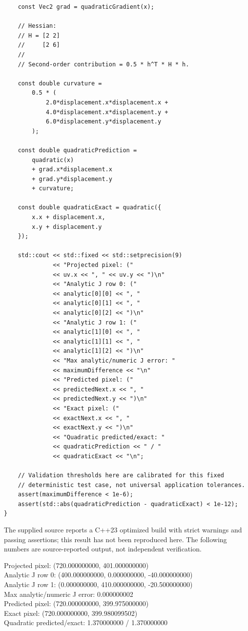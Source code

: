 \begin{verbatim}
    const Vec2 grad = quadraticGradient(x);

    // Hessian:
    // H = [2 2]
    //     [2 6]
    //
    // Second-order contribution = 0.5 * h^T * H * h.

    const double curvature =
        0.5 * (
            2.0*displacement.x*displacement.x +
            4.0*displacement.x*displacement.y +
            6.0*displacement.y*displacement.y
        );

    const double quadraticPrediction =
        quadratic(x)
        + grad.x*displacement.x
        + grad.y*displacement.y
        + curvature;

    const double quadraticExact = quadratic({
        x.x + displacement.x,
        x.y + displacement.y
    });

    std::cout << std::fixed << std::setprecision(9)
              << "Projected pixel: ("
              << uv.x << ", " << uv.y << ")\n"
              << "Analytic J row 0: ("
              << analytic[0][0] << ", "
              << analytic[0][1] << ", "
              << analytic[0][2] << ")\n"
              << "Analytic J row 1: ("
              << analytic[1][0] << ", "
              << analytic[1][1] << ", "
              << analytic[1][2] << ")\n"
              << "Max analytic/numeric J error: "
              << maximumDifference << "\n"
              << "Predicted pixel: ("
              << predictedNext.x << ", "
              << predictedNext.y << ")\n"
              << "Exact pixel: ("
              << exactNext.x << ", "
              << exactNext.y << ")\n"
              << "Quadratic predicted/exact: "
              << quadraticPrediction << " / "
              << quadraticExact << "\n";

    // Validation thresholds here are calibrated for this fixed
    // deterministic test case, not universal application tolerances.
    assert(maximumDifference < 1e-6);
    assert(std::abs(quadraticPrediction - quadraticExact) < 1e-12);
}
\end{verbatim}

The supplied source reports a C++23 optimized build with strict warnings and passing assertions; this result has not been reproduced here. The following numbers are source-reported output, not independent verification.

Projected pixel: (720.000000000, 401.000000000)\\
Analytic J row 0: (400.000000000, 0.000000000, -40.000000000)\\
Analytic J row 1: (0.000000000, 410.000000000, -20.500000000)\\
Max analytic/numeric J error: 0.000000002\\
Predicted pixel: (720.000000000, 399.975000000)\\
Exact pixel: (720.000000000, 399.980099502)\\
Quadratic predicted/exact: 1.370000000 / 1.370000000

